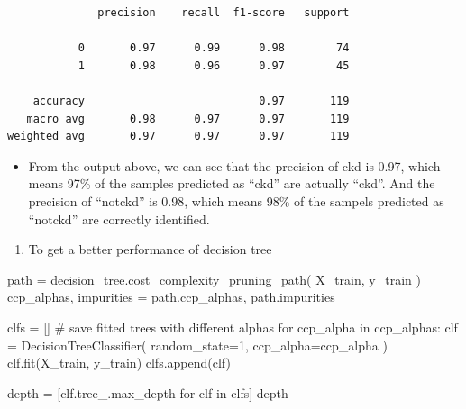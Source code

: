 \documentclass[
  11pt,
  letterpaper,
  DIV=11,
  numbers=noendperiod]{scrartcl}
\newenvironment{Shaded}{\begin{snugshade}}{\end{snugshade}}
\newcommand{\CommentTok}[1]{\textcolor[rgb]{0.37,0.37,0.37}{#1}}
\newcommand{\ControlFlowTok}[1]{\textcolor[rgb]{0.00,0.23,0.31}{#1}}
\newcommand{\DecValTok}[1]{\textcolor[rgb]{0.68,0.00,0.00}{#1}}
\newcommand{\KeywordTok}[1]{\textcolor[rgb]{0.00,0.23,0.31}{#1}}
\newcommand{\NormalTok}[1]{\textcolor[rgb]{0.00,0.23,0.31}{#1}}
\newcommand{\OperatorTok}[1]{\textcolor[rgb]{0.37,0.37,0.37}{#1}}
\providecommand{\tightlist}{%
  \setlength{\itemsep}{0pt}\setlength{\parskip}{0pt}}\usepackage{longtable,booktabs,array}
\begin{document}
\begin{verbatim}
              precision    recall  f1-score   support

           0       0.97      0.99      0.98        74
           1       0.98      0.96      0.97        45

    accuracy                           0.97       119
   macro avg       0.98      0.97      0.97       119
weighted avg       0.97      0.97      0.97       119
\end{verbatim}

\begin{itemize}
\tightlist
\item
  From the output above, we can see that the precision of ckd is 0.97,
  which means 97\% of the samples predicted as ``ckd'' are actually
  ``ckd''. And the precision of ``notckd'' is 0.98, which means 98\% of
  the sampels predicted as ``notckd'' are correctly identified.
\end{itemize}

\begin{enumerate}
\def\labelenumi{\arabic{enumi}.}
\setcounter{enumi}{10}
\tightlist
\item
  To get a better performance of decision tree
\end{enumerate}

\begin{Shaded}
\begin{Highlighting}[]
\NormalTok{path }\OperatorTok{=}\NormalTok{ decision\_tree.cost\_complexity\_pruning\_path(}
\NormalTok{    X\_train, }
\NormalTok{    y\_train}
\NormalTok{)}
\NormalTok{ccp\_alphas, impurities }\OperatorTok{=}\NormalTok{ path.ccp\_alphas, path.impurities}
\end{Highlighting}
\end{Shaded}

\begin{Shaded}
\begin{Highlighting}[]
\NormalTok{clfs }\OperatorTok{=}\NormalTok{ [] }\CommentTok{\# save fitted trees with different alphas}
\ControlFlowTok{for}\NormalTok{ ccp\_alpha }\KeywordTok{in}\NormalTok{ ccp\_alphas:}
\NormalTok{    clf }\OperatorTok{=}\NormalTok{ DecisionTreeClassifier(}
\NormalTok{        random\_state}\OperatorTok{=}\DecValTok{1}\NormalTok{, }
\NormalTok{        ccp\_alpha}\OperatorTok{=}\NormalTok{ccp\_alpha}
\NormalTok{        )}
\NormalTok{    clf.fit(X\_train, y\_train)}
\NormalTok{    clfs.append(clf)}

\NormalTok{depth }\OperatorTok{=}\NormalTok{ [clf.tree\_.max\_depth }\ControlFlowTok{for}\NormalTok{ clf }\KeywordTok{in}\NormalTok{ clfs]}
\NormalTok{depth}
\end{Highlighting}
\end{Shaded}
\end{document}
